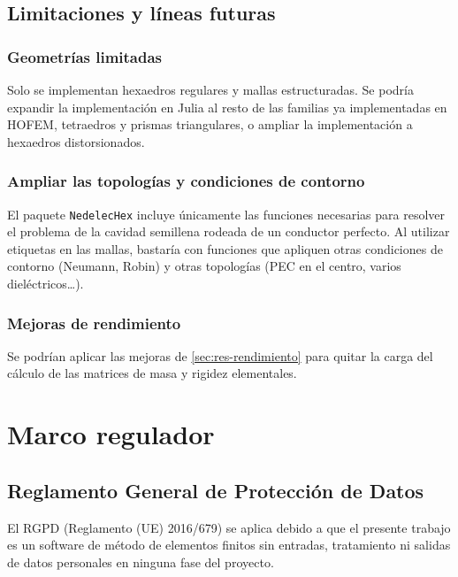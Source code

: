 \documentclass[12pt]{report} %
\begin{document}
\section{Limitaciones y líneas futuras}\label{sec:limitaciones}
\subsection{Geometrías limitadas}

Solo se implementan hexaedros regulares y mallas estructuradas. Se podría expandir la implementación en Julia al resto de las familias ya implementadas en HOFEM, tetraedros y prismas triangulares, o ampliar la implementación a hexaedros distorsionados.

\subsection{Ampliar las topologías y condiciones de contorno}
El paquete \texttt{NedelecHex} incluye únicamente las funciones necesarias para resolver el problema de la cavidad semillena rodeada de un conductor perfecto. Al utilizar etiquetas en las mallas, bastaría con funciones que apliquen otras condiciones de contorno (Neumann, Robin) y otras topologías (PEC en el centro, varios dieléctricos\ldots).

\subsection{Mejoras de rendimiento}
Se podrían aplicar las mejoras de \autoref{sec:res-rendimiento} para quitar la carga del cálculo de las matrices de masa y rigidez elementales.



\chapter{Marco regulador}\label{cap:marco-regulador}

\section{Reglamento General de Protección de Datos}
El RGPD (Reglamento (UE) 2016/679) se aplica debido a que el presente trabajo es un software de método de elementos finitos sin entradas, tratamiento ni salidas de datos personales en ninguna fase del proyecto.
\end{document}

